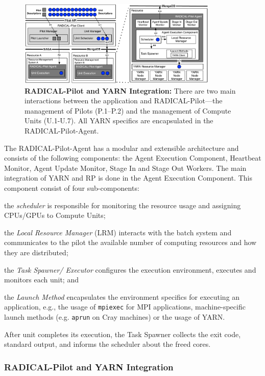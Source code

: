 \begin{figure}
    \centering
    \includegraphics[width=0.85\textwidth]{figures/data_analytics_hpc/hpc_hadoop/rp-architecture-yarn.pdf}
    \caption{\textbf{RADICAL-Pilot and YARN Integration:} There are two main interactions between the application and RADICAL-Pilot---the management of Pilots (P.1--P.2) and the management of Compute Units (U.1-U.7).  All YARN specifics are encapsulated in the RADICAL-Pilot-Agent.\label{fig:comp_rp_arch}}
\end{figure}

The RADICAL-Pilot-Agent has a modular and extensible architecture and consists of the following components: the Agent Execution Component, Heartbeat Monitor, Agent Update Monitor, Stage In and Stage Out Workers.
The main integration of YARN and RP is done in the Agent Execution Component.
This component consist of four sub-components:
\begin{inparaenum}[a)]
    \item the \textit{scheduler} is responsible for monitoring the resource usage and assigning CPUs/GPUs to Compute Units;
    \item the \textit{Local Resource Manager} (LRM) interacts with the batch system and communicates to the pilot the available number of computing resources and how they are distributed;
    \item the \textit{Task Spawner/ Executor} configures the execution environment, executes and monitors each unit; and
    \item the \textit{Launch Method} encapsulates the environment specifics for executing an application, e.g., the usage of \texttt{mpiexec} for MPI applications, machine-specific launch methods (e.g. \texttt{aprun} on Cray machines) or the usage of YARN.
\end{inparaenum}
After unit completes its execution, the Task Spawner collects the exit code, standard output, and informs the scheduler about the freed cores.

\subsubsection*{RADICAL-Pilot and YARN Integration}
\label{sssec:rp-yarn}

